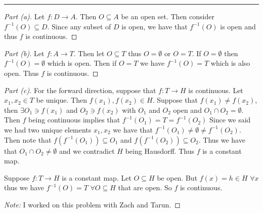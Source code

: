\documentclass[leqno]{article}
\theoremstyle{nonumberplain}
\newtheorem{proof}{Proof}
\begin{document}
\noindent\rule[0.5ex]{\linewidth}{1pt}

\begin{proof}[Part (a)]
Let $f\colon D \to A$.  Then $O \subseteq A$ be an open set. Then consider $f^{-1}(O)\subseteq D$.  Since any subset of $D$ is open, we have that $f^{-1}(O)$ is open and thus $f$ is continuous.
\end{proof}

\begin{proof}[Part (b)]
Let $f\colon A \to T$.  Then let $O \subseteq T$ thus $O=\emptyset$ or $O=T$.  If $O=\emptyset$ then $f^{-1}(O)=\emptyset$ which is open.  Then if $O=T$ we have $f^{-1}(O)=T$ which is also open.  Thus $f$ is continuous.
\end{proof}

\begin{proof}[Part (c)]
For the forward direction, suppose that $f\colon T\to H$ is continuous. Let $x_1,x_2\in T$ be unique. Then $f(x_1),f(x_2)\in H$. Suppose that $f(x_1)\neq f(x_2)$, then $\exists O_1 \ni f(x_1)$ and $O_2 \ni f(x_2)$ with $O_1$ and $O_2$ open and $O_1\cap O_2=\emptyset$.  Then $f$ being continuous implies that $f^{-1}(O_1)=T=f^{-1}(O_2)$ Since we said we had two unique elements $x_1,x_2$ we have that $f^{-1}(O_1)\neq\emptyset \neq f^{-1}(O_2)$.  Then note that $f(f^{-1}(O_1))\subseteq O_1$ and $f(f^{-1}(O_2))\subseteq O_2$.  Thus we have that $O_1\cap O_2 \neq \emptyset$ and we contradict $H$ being Hausdorff.  Thus $f$ is a constant map.

Suppose $f\colon T \to H$ is a constant map.  Let $O\subseteq H$ be open.  But $f(x)=h\in H$ $\forall x$ thus we have $f^{-1}(O)=T$ $\forall O\subseteq H$ that are open.  So $f$ is continuous.

\emph{Note:} I worked on this problem with Zach and Tarun.
\end{proof}




\pagebreak


\end{document}
